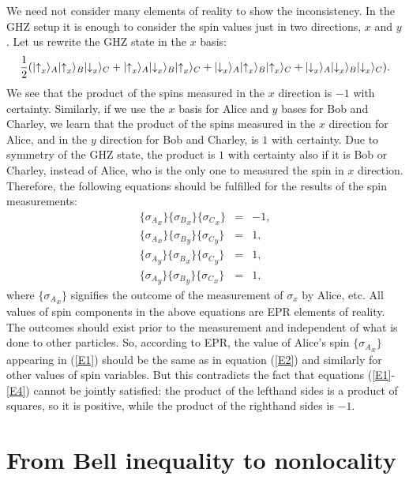 \documentclass[12pt]{article}
\begin{document}
 We need not  consider many elements of reality to show the inconsistency. In the GHZ setup it is enough to consider the spin values  just in two directions, $x$ and $y$. Let us rewrite the GHZ state in the $x$ basis:
\begin{equation}
\nonumber
 {1\over
  2}(|{\uparrow}_x\rangle_A
|{\uparrow}_x\rangle_B|{\downarrow}_x\rangle_C
 + |{\uparrow}_x\rangle_A
|{\downarrow}_x\rangle_B|{\uparrow}_x\rangle_C
 +
|{\downarrow}_x\rangle_A
|{\uparrow}_x\rangle_B|{\uparrow}_x\rangle_C +
|{\downarrow}_x\rangle_A
|{\downarrow}_x\rangle_B|{\downarrow}_x\rangle_C).
\end{equation}
We see that the product of the spins  measured in the $x$ direction is $-1$ with certainty.
Similarly, if we use the $x$ basis for Alice and $y$ bases for Bob and Charley, we learn that the product of the spins measured in the $x$ direction for Alice, and in the $y$ direction for Bob and Charley, is $1$ with certainty. Due to symmetry of the GHZ state, the product is $1$ with certainty also if it is Bob or Charley, instead of Alice, who  is the only one to measured the spin in $x$ direction. Therefore, the following equations should be fulfilled for the results of the spin measurements:
\begin{eqnarray}
 \{{\sigma_A}_x\} \{{\sigma_B}_x\} \{{\sigma_C}_x\} & = &  -1 , \label{E1}\\
 \{{\sigma_A}_x\} \{{\sigma_B}_y\} \{{\sigma_C}_y\} & = & 1 ,\label{E2}\\
\{{\sigma_A}_y\} \{{\sigma_B}_x\} \{{\sigma_C}_y\} & = & 1 , \label{E3}\\
 \{{\sigma_A}_y\} \{{\sigma_B}_y\} \{{\sigma_C}_x\} & = & 1 ,\label{E4}
\end{eqnarray}
\noindent
where $\{{\sigma_A}_x\}$ signifies the outcome of the measurement  of
$\sigma_x$ by  Alice, etc.
 All values of  spin components  in the above equations are  EPR elements of reality. The outcomes should exist prior to the measurement and independent of what is done to other particles. So, according to EPR, the value of Alice's spin $\{{\sigma_A}_x\}$ appearing in (\ref{E1}) should be the same as in equation (\ref{E2}) and similarly for other values of spin variables. But this contradicts the fact that equations (\ref{E1}-\ref{E4}) cannot be jointly satisfied: the product of the lefthand sides is a product of squares, so it is positive, while the product of the righthand sides is $-1$.

\section{From Bell inequality to nonlocality }
\end{document}
